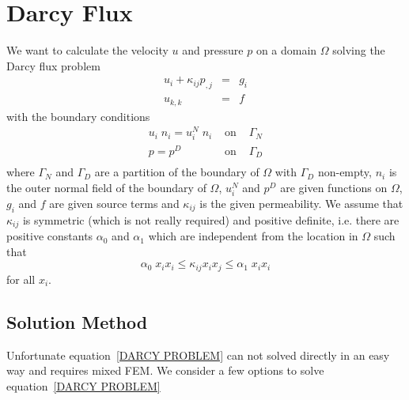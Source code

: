 
%
%
%

\section{Darcy Flux}
\label{DARCY FLUX}
We want to calculate the velocity $u$ and pressure $p$ on a domain $\Omega$
solving the Darcy flux problem
\begin{equation}\label{DARCY PROBLEM}
\begin{array}{rcl}
u_{i} + \kappa_{ij} p_{,j} & = & g_{i} \\
u_{k,k} & = & f
\end{array}
\end{equation} 
with the boundary conditions
\begin{equation}\label{DARCY BOUNDARY}
\begin{array}{rcl}
u_{i} \; n_{i}  = u^{N}_{i}  \; n_{i} & \mbox{ on } & \Gamma_{N} \\
p = p^{D} &  \mbox{ on } & \Gamma_{D} \\ 
\end{array}
\end{equation} 
where $\Gamma_{N}$ and $\Gamma_{D}$ are a partition of the boundary of
$\Omega$ with $\Gamma_{D}$ non-empty, $n_{i}$ is the outer normal field of the
boundary of $\Omega$, $u^{N}_{i}$ and $p^{D}$ are given functions on $\Omega$,
$g_{i}$ and $f$ are given source terms and $\kappa_{ij}$ is the given
permeability.
We assume that $\kappa_{ij}$ is symmetric (which is not really required) and
positive definite, i.e. there are positive constants $\alpha_{0}$ and
$\alpha_{1}$ which are independent from the location in $\Omega$ such that
\begin{equation}
\alpha_{0} \; x_{i} x_{i} \le \kappa_{ij} x_{i} x_{j} \le \alpha_{1} \; x_{i} x_{i}
\end{equation}
for all $x_{i}$.


\subsection{Solution Method \label{DARCY SOLVE}}
Unfortunate equation~\ref{DARCY PROBLEM} can not solved directly in an easy way and requires mixed FEM.  
We consider a few options to solve equation~\ref{DARCY PROBLEM}
